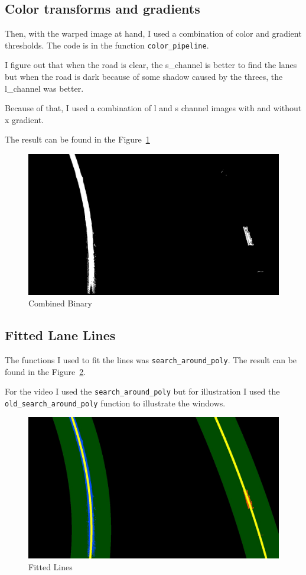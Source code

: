 \documentclass[11pt, a4paper]{article}
\begin{document}
\subsection{Color transforms and gradients}%
\label{sub:color_transforms_and_gradients}


Then, with the warped image at hand, I used a combination of color and gradient thresholds. The code is in the function \texttt{color\_pipeline}.


I figure out that when the road is clear, the s\_channel is better to find the lanes but when the road is dark because of some shadow caused by the threes, the l\_channel was better. 

Because of that, I used a combination of l and s channel images with and without x gradient.

The result can be found in the Figure~\ref{fig:combined_binary}



\begin{figure}[htb!]
	\centering
	\includegraphics[width=0.8\linewidth]{combined_binary}
	\caption{Combined Binary}
	\label{fig:combined_binary}
\end{figure}




\subsection{Fitted Lane Lines}%
\label{sub:fitted_lane_lines}

The functions I used to fit the lines was \texttt{search\_around\_poly}. The result can be found in the Figure~\ref{fig:fitted_lines}.


For the video I used the \texttt{search\_around\_poly} but for illustration I used the \texttt{old\_search\_around\_poly} function to illustrate the windows. 

\begin{figure}[htb!]
	\centering
	\includegraphics[width=0.8\linewidth]{fitted_lines}
	\caption{Fitted Lines}
	\label{fig:fitted_lines}
\end{figure}
\end{document}
